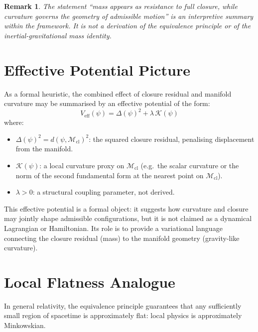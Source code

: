 \documentclass[12pt]{article}
\newtheorem{remark}[theorem]{Remark}
\newcommand{\Mcl}{\mathcal{M}_{\mathrm{cl}}}
\begin{document}
\begin{remark}
The statement ``mass appears as resistance to full closure, while curvature governs the geometry of admissible motion'' is an interpretive summary within the framework. It is not a derivation of the equivalence principle or of the inertial-gravitational mass identity.
\end{remark}

\section{Effective Potential Picture}\label{sec:potential}

As a formal heuristic, the combined effect of closure residual and manifold curvature may be summarised by an effective potential of the form:
\begin{equation}\label{eq:potential}
    V_{\mathrm{eff}}(\psi) = \Delta(\psi)^2 + \lambda\, \mathcal{K}(\psi)
\end{equation}
where:
\begin{itemize}
    \item $\Delta(\psi)^2 = d(\psi, \Mcl)^2$: the squared closure residual, penalising displacement from the manifold.
    \item $\mathcal{K}(\psi)$: a local curvature proxy on $\Mcl$ (e.g.\ the scalar curvature or the norm of the second fundamental form at the nearest point on $\Mcl$).
    \item $\lambda > 0$: a structural coupling parameter, not derived.
\end{itemize}

This effective potential is a formal object: it suggests how curvature and closure may jointly shape admissible configurations, but it is not claimed as a dynamical Lagrangian or Hamiltonian. Its role is to provide a variational language connecting the closure residual (mass) to the manifold geometry (gravity-like curvature).

\section{Local Flatness Analogue}\label{sec:flatness}

In general relativity, the equivalence principle guarantees that any sufficiently small region of spacetime is approximately flat: local physics is approximately Minkowskian.
\end{document}
